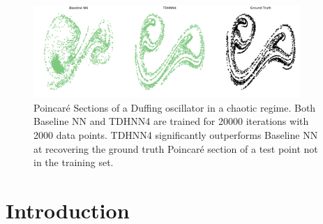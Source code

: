 \documentclass{article}
\begin{document}
\begin{abstract}
Learning the dynamics of complex physical systems requires models with well chosen inductive biases. Recently, it was shown that neural networks designed to learn a Hamiltonian and exploit Hamilton's equations significantly outperform existing approaches in predicting trajectories of autonomous systems that depend implicitly on time. Despite this success, many real world physical systems are non-autonomous and depend explicitly on time. In this paper, we address this challenge by embedding a modified Port-Hamiltonian into our neural networks that extends the general Hamiltonian to capture damped and forced systems alike. We show that our network can learn systems as complex as the Duffing equation in the chaotic regime and recover the underlying Hamiltonian, force and damping terms. For such a system, we are also able to visually recover its Poincar\'e section - a crucial map in identifying chaotic trajectories.
\end{abstract}

\begin{figure}[ht!]
\centering
\includegraphics[width=0.9\textwidth]{figures/main_fig.pdf}
\caption{Poincar\'e Sections of a Duffing oscillator in a chaotic regime. Both Baseline NN and TDHNN4 are trained for 20000 iterations with 2000 data points. TDHNN4 significantly outperforms Baseline NN at recovering the ground truth Poincar\'e section of a test point not in the training set.}
\label{fig.chaos1}
\end{figure}

\section{Introduction}
\end{document}
